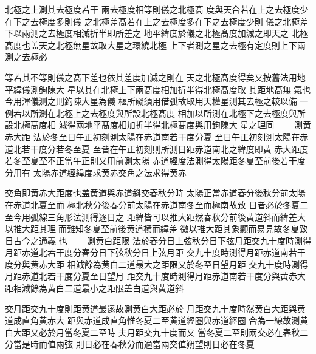 \begin{正文}
北極之上測其去極度若干
兩去極度相等則儀之北極髙
度與天合若在上之去極度少在下之去極度多則儀
之北極差髙若在上之去極度多在下之去極度少則
儀之北極差下以兩測之去極度相減折半即所差之
地平緯度於儀之北極髙度加減之即天之
北極髙度也盖天之北極無星故取大星之環繞北極
上下者測之星之去極有定度則上下兩測之去極必
\par
等若其不等則儀之髙下差也依其差度加減之則在
天之北極髙度得矣又按舊法用地平緯儀測鉤陳大
星以其在北極上下兩髙度相加折半得北極髙度取
其距地髙無𫎇氣也今用渾儀測之則鉤陳大星為儀
樞所礙須用借弧故取用天權星測其去極之較以備
一例若以所測在北極上之去極度與所設北極髙度
相加以所測在北極下之去極度與所設北極髙度相
減得兩地平髙度相加折半得北極髙度與用鉤陳大
星之理同
　　測黄赤大距
法於冬至日午正初刻測太陽在赤道南若干度分夏
至日午正初刻測太陽在赤道北若干度分若冬至夏
至皆在午正初刻則所測日距赤道南北之緯度即黄
赤大距度若冬至夏至不正當午正則又用前測太陽
赤道經度法測得太陽距冬夏至前後若干度分用有
太陽赤道經緯度求黄赤交角之法求得黄赤
\par
交角即黄赤大距度也盖黄道與赤道斜交春秋分時
太陽正當赤道春分後秋分前太陽在赤道北夏至而
極北秋分後春分前太陽在赤道南冬至而極南故致
日者必於冬夏二至今用弧線三角形法測得逐日之
距緯皆可以推大距然春秋分前後黄道斜而緯差大
以推大距其理𨼆而難知冬夏至前後黄道横而緯差
微以推大距其象顯而易見故冬夏致日古今之通義
也
　　測黄白距限
法於春分日上弦秋分日下弦月距交九十度時測得
月距赤道北若干度分春分日下弦秋分日上弦月距
交九十度時測得月距赤道南若干度分與黄赤大距
相減餘為黄白二道最大之距限又於冬至日望月距
交九十度時測得月距赤道北若干度分夏至日望月
距交九十度時測得月距赤道南若干度分與黄赤大
距相減餘為黄白二道最小之距限盖白道與黄道斜
\par
交月距交九十度則距黄道最逺故測黄白大距必於
月距交九十度時然黄白大距與黄道成直角黄赤大
距與赤道成直角惟冬夏二至黄道經圈與赤道經圈
合為一線故測黄白大距又必於月當冬夏二至時
夫月距交九十度而又
當冬夏二至則兩交必在春秋二分當是時而值兩弦
則日必在春秋分而適當兩交值朔望則日必在冬夏

\end{正文}
